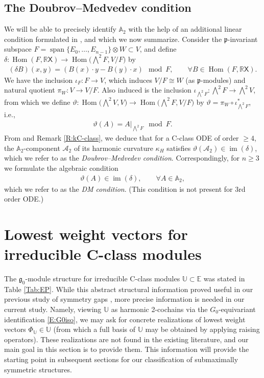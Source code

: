 \documentclass[pdftex]{sigma}%
\newcommand\tensor{\otimes}
\DeclareMathOperator{\img}{im}
\DeclareMathOperator{\sn}{span}
\DeclareMathOperator{\hm}{Hom}
\newcommand\fg{\mathfrak{g}}
\newcommand\fp{\mathfrak{p}}
\newcommand{\R}{\mathbb{R}}
\newcommand\bbE{\mathbb{E}}
\newcommand\bbU{\mathbb{U}}
\newcommand\bbA{\mathbb{A}}
\newcommand\sfX{\mathsf{X}}
\newcommand\cA{\mathcal{A}}
\numberwithin{equation}{section}
\begin{document}
\subsection{The Doubrov--Medvedev condition} \label{S:Ef}

 We will be able to precisely identify $\bbA_2$ with the help of an additional linear condition formulated in \cite[Section~3.1, Proposition~4]{DM2014}, and which we now summarize. Consider the $\fp$-invariant subspace $F=\sn \{E_0,\dots,E_{n-1}\}\tensor W \subset V$, and define $\delta\colon \hm(F,\R\sfX) \to \hm \bigl(\bigwedge^2 F, V/F\bigr)$ by
\begin{align}\label{E:delta}
(\delta B)(x,y)=(B(x)\cdot y -B(y)\cdot x)\mod F, \qquad \forall B \in \hm(F,\R\sfX).
\end{align}
We have the inclusion $\iota_F\colon F \to V$, which induces $V/F \cong W$ (as $\fp$-modules) and natural quotient $\pi_W\colon V \to V/F$. Also induced is the inclusion $\iota_{\bigwedge^2F} \colon \bigwedge^2F \to \bigwedge^2V$, from which we define $\vartheta\colon \hm \bigl(\bigwedge^2V,V\bigr) \to \hm \bigl(\bigwedge^2F,V/F\bigr) $ by $\vartheta = \pi_W \circ \iota_{\bigwedge^2 F}^*$, i.e.,
\begin{align}\label{E:alpha}
\vartheta(A) = \left.A\right|_{\bigwedge^2F} \mod F.
\end{align}
From \cite[Section~3.1, Proposition~4]{DM2014} and Remark \ref{R:kC-class}, we deduce that for a C-class ODE of order $\geq 4$, the $\bbA_2$-component $\cA_2$ of its harmonic curvature $\kappa_H$ satisfies $\vartheta(\cA_2) \in \img(\delta)$, which we refer to as the {\em Doubrov--Medvedev condition}. Correspondingly, for $n \geq 3$ we formulate the algebraic condition
\begin{align}\label{E:ALC}
\vartheta(A) \in \img(\delta), \qquad \forall A \in \bbA_2,
\end{align}
which we refer to as the {\em DM condition}. (This condition is not present for 3rd order ODE.)
 \section{Lowest weight vectors for irreducible C-class modules} \label{S:lwv}

The $\fg_0$-module structure for irreducible C-class modules $\bbU \subset \bbE$ was stated in Table \ref{Tab:EP}. While this abstract structural information proved useful in our previous study of symmetry gaps \cite{KT2021}, more precise information is needed in our current study. Namely, viewing $\bbU$ as harmonic 2-cochains via the $G_0$-equivariant identification \eqref{E:G0iso}, we may ask for concrete realizations of lowest weight vectors $\Phi_\bbU \in \bbU$ (from which a full basis of $\bbU$ may be obtained by applying raising operators). These realizations are not found in the existing literature, and our main goal in this section is to provide them. This information will provide the starting point in subsequent sections for our classification of submaximally symmetric structures.
\end{document}
